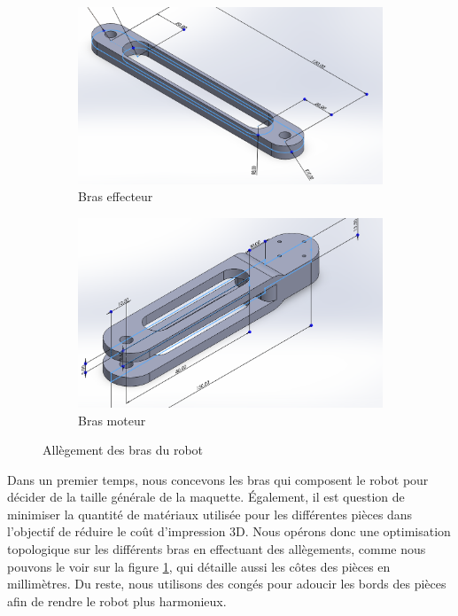 \documentclass[a4paper, 11pt]{report}
\begin{document}
\begin{figure}[h]
    \centering
    \begin{subfigure}[t]{0.50\textwidth}
        \centering
        \includegraphics[width=\textwidth]{Figures/bras_effecteur.png}
        \caption{Bras effecteur}
    \end{subfigure}
    \hfill
    \begin{subfigure}[t]{0.45\textwidth}
        \centering
        \includegraphics[width=\textwidth]{Figures/bras_moteur.png}
        \caption{Bras moteur}
    \end{subfigure}
    \caption{Allègement des bras du robot}
    \label{fig:bras}
\end{figure}
Dans un premier temps, nous concevons les bras qui composent le robot pour décider de la taille générale de la maquette.
Également, il est question de minimiser la quantité de matériaux utilisée pour les différentes pièces dans l'objectif de réduire le coût d'impression 3D.
Nous opérons donc une optimisation topologique sur les différents bras en effectuant des allègements, comme nous pouvons le voir sur la figure \ref{fig:bras}, 
qui détaille aussi les côtes des pièces en millimètres. Du reste, nous utilisons des congés pour adoucir les bords des pièces afin de rendre le robot plus harmonieux.
\end{document}
